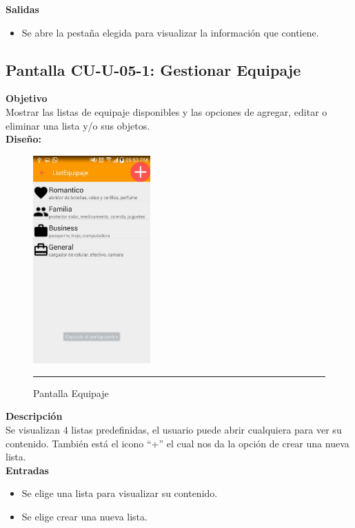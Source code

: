 \textbf{Salidas}
\begin{itemize}
\item Se abre la pestaña elegida para visualizar la información que contiene.
\end{itemize}
\clearpage
\hypertarget{CU-U-05-1}{}
\subsection{Pantalla CU-U-05-1: Gestionar Equipaje}
\textbf{Objetivo}\\
Mostrar las listas de equipaje disponibles y las opciones de agregar, editar o eliminar una lista y/o sus objetos. \\

\textbf{Diseño:}
\begin{figure}[h]
	\centering
		\includegraphics[width=0.4\textwidth]{Figuras/intListaEquipaje.jpg}
		\rule{30em}{0.5pt}
	\caption[Pantalla Equipaje]{Pantalla Equipaje}
	\label{fig:intListaEquipaje}
\end{figure}

\textbf{Descripción} \\
Se visualizan 4 listas predefinidas, el usuario puede abrir cualquiera para ver su contenido. También está el icono ``+'' el cual nos da la opción de crear una nueva lista. \\

\textbf{Entradas}
\begin{itemize}
\item Se elige una lista para visualizar su contenido.
\item Se elige crear una nueva lista.
\end{itemize}


